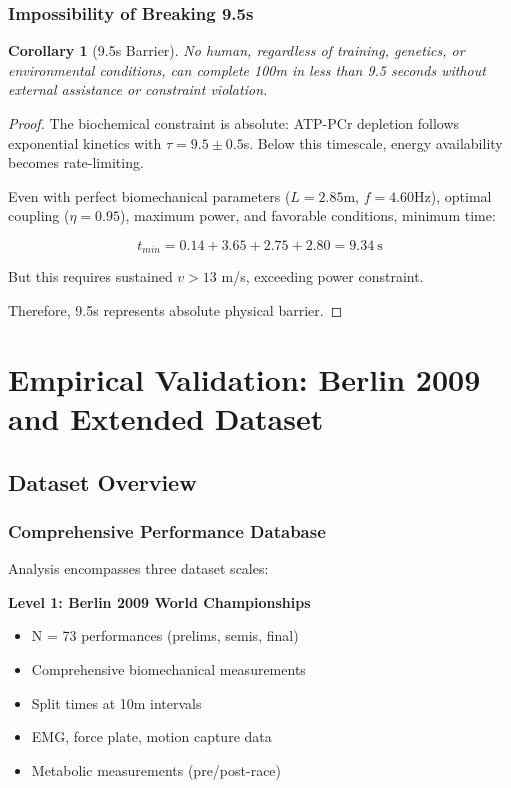 \documentclass[10pt]{article}
\newtheorem{corollary}{Corollary}
\begin{document}
\subsubsection{Impossibility of Breaking 9.5s}

\begin{corollary}[9.5s Barrier]
No human, regardless of training, genetics, or environmental conditions, can complete 100m in less than 9.5 seconds without external assistance or constraint violation.
\end{corollary}

\begin{proof}
The biochemical constraint is absolute: ATP-PCr depletion follows exponential kinetics with $\tau = 9.5 \pm 0.5$s. Below this timescale, energy availability becomes rate-limiting.

Even with perfect biomechanical parameters ($L = 2.85$m, $f = 4.60$Hz), optimal coupling ($\eta = 0.95$), maximum power, and favorable conditions, minimum time:

\begin{equation}
t_{min} = 0.14 + 3.65 + 2.75 + 2.80 = 9.34~\text{s}
\end{equation}

But this requires sustained $v > 13$ m/s, exceeding power constraint.

Therefore, 9.5s represents absolute physical barrier.
\end{proof}

\section{Empirical Validation: Berlin 2009 and Extended Dataset}

\subsection{Dataset Overview}

\subsubsection{Comprehensive Performance Database}

Analysis encompasses three dataset scales:

\textbf{Level 1: Berlin 2009 World Championships}
\begin{itemize}
\item N = 73 performances (prelims, semis, final)
\item Comprehensive biomechanical measurements
\item Split times at 10m intervals
\item EMG, force plate, motion capture data
\item Metabolic measurements (pre/post-race)
\end{itemize}
\end{document}
